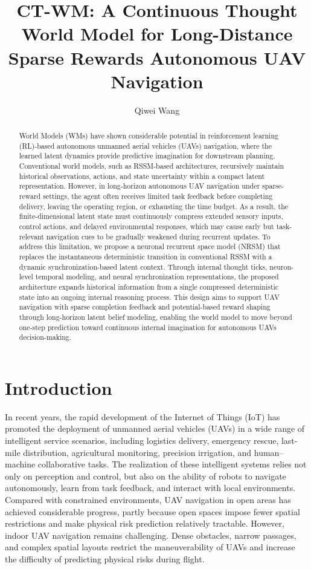 \documentclass{article}
\title{CT-WM: A Continuous Thought World Model for Long-Distance Sparse Rewards Autonomous UAV Navigation}
\author{
Qiwei Wang
}
\begin{document}
\maketitle

\begin{abstract}
World Models (WMs) have shown considerable potential in reinforcement learning (RL)-based autonomous unmanned aerial vehicles (UAVs) navigation, where the learned latent dynamics provide predictive imagination for downstream planning. Conventional world models, such as RSSM-based architectures, recursively maintain historical observations, actions, and state uncertainty within a compact latent representation. However, in long-horizon autonomous UAV navigation under sparse-reward settings, the agent often receives limited task feedback before completing delivery, leaving the operating region, or exhausting the time budget. As a result, the finite-dimensional latent state must continuously compress extended sensory inputs, control actions, and delayed environmental responses, which may cause early but task-relevant navigation cues to be gradually weakened during recurrent updates. To address this limitation, we propose a neuronal recurrent space model (NRSM) that replaces the instantaneous deterministic transition in conventional RSSM with a dynamic synchronization-based latent context. Through internal thought ticks, neuron-level temporal modeling, and neural synchronization representations, the proposed architecture expands historical information from a single compressed deterministic state into an ongoing internal reasoning process. This design aims to support UAV navigation with sparse completion feedback and potential-based reward shaping through long-horizon latent belief modeling, enabling the world model to move beyond one-step prediction toward continuous internal imagination for autonomous UAVs decision-making.
\end{abstract}

\section{Introduction}

In recent years, the rapid development of the Internet of Things (IoT) has promoted the deployment of unmanned aerial vehicles (UAVs) in a wide range of intelligent service scenarios, including logistics delivery, emergency rescue, last-mile distribution, agricultural monitoring, precision irrigation, and human--machine collaborative tasks. The realization of these intelligent systems relies not only on perception and control, but also on the ability of robots to navigate autonomously, learn from task feedback, and interact with local environments. Compared with constrained environments, UAV navigation in open areas has achieved considerable progress, partly because open spaces impose fewer spatial restrictions and make physical risk prediction relatively tractable. However, indoor UAV navigation remains challenging. Dense obstacles, narrow passages, and complex spatial layouts restrict the maneuverability of UAVs and increase the difficulty of predicting physical risks during flight.
\end{document}
